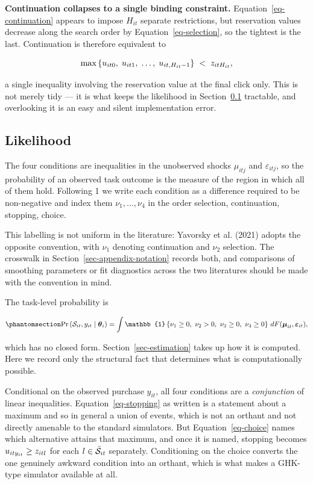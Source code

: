 \documentclass[
  letterpaper,
  DIV=11,
  numbers=noendperiod]{scrartcl}
\begin{document}
\textbf{Continuation collapses to a single binding constraint.}
Equation~\ref{eq-continuation} appears to impose \(H_{it}\) separate
restrictions, but reservation values decrease along the search order by
Equation~\ref{eq-selection}, so the tightest is the last. Continuation
is therefore equivalent to

\[
\max\left\{u_{it0},\; u_{it1},\; \dots,\; u_{it,H_{it}-1}\right\} \;<\; z_{it H_{it}},
\]

a single inequality involving the reservation value at the final click
only. This is not merely tidy --- it is what keeps the likelihood in
Section~\ref{sec-model-likelihood} tractable, and overlooking it is an
easy and silent implementation error.

\subsection{Likelihood}\label{sec-model-likelihood}

The four conditions are inequalities in the unobserved shocks
\(\mu_{itj}\) and \(\varepsilon_{itj}\), so the probability of an
observed task outcome is the measure of the region in which all of them
hold. Following 1 we write each condition as a difference required to be
non-negative and index them \(\nu_1,\dots,\nu_4\) in the order
selection, continuation, stopping, choice.

This labelling is not uniform in the literature: Yavorsky et al. (2021)
adopts the opposite convention, with \(\nu_1\) denoting continuation and
\(\nu_2\) selection. The crosswalk in
Section~\ref{sec-appendix-notation} records both, and comparisons of
smoothing parameters or fit diagnostics across the two literatures
should be made with the convention in mind.

The task-level probability is

\begin{equation}\protect\phantomsection\label{eq-task-likelihood}{
\Pr\left(\Sset_{it}, y_{it} \mid \bftheta_i\right)
= \int \mathbb{1}\left\{\nu_1 \ge 0,\ \nu_2 > 0,\ \nu_3 \ge 0,\ \nu_4 \ge 0\right\}
  \, dF(\boldsymbol\mu_{it}, \boldsymbol\varepsilon_{it}),
}\end{equation}

which has no closed form. Section~\ref{sec-estimation} takes up how it
is computed. Here we record only the structural fact that determines
what is computationally possible.

Conditional on the observed purchase \(y_{it}\), all four conditions are
a \emph{conjunction} of linear inequalities. Equation~\ref{eq-stopping}
as written is a statement about a maximum and so in general a union of
events, which is not an orthant and not directly amenable to the
standard simulators. But Equation~\ref{eq-choice} names which
alternative attains that maximum, and once it is named, stopping becomes
\(u_{it y_{it}} \ge z_{itl}\) for each \(l \in \bar{\mathcal{S}}_{it}\)
separately. Conditioning on the choice converts the one genuinely
awkward condition into an orthant, which is what makes a GHK-type
simulator available at all.
\end{document}
